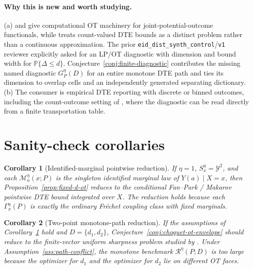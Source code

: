 \documentclass[11pt]{article}
\renewcommand{\Pr}{\mathbb{P}}
\theoremstyle{definition}
\theoremstyle{plain}
\newtheorem{corollary}{Corollary}
\theoremstyle{remark}
\begin{document}
\paragraph{Why this is new and worth studying.}
(a) \citet[Supplementary Appendix 3]{Russell2021} and
\citet[Sections 2--3]{OberReynolds2023} give computational OT machinery for
joint-potential-outcome functionals, while \citet[abstract and Section 1]{Mullahy2023}
treats count-valued DTE bounds as a distinct problem rather than a continuous
approximation.  The prior
\texttt{eid\_dist\_synth\_control}/\texttt{v1} reviewer explicitly asked for an
LP/OT diagnostic with dimension and bound width for \(\Pr\{\Delta\le d\}\).
Conjecture~\ref{conj:finite-diagnostic} contributes the missing named diagnostic
\(G^\eta_P(D)\) for an entire monotone DTE path and ties its dimension to overlap cells
and an independently generated separating dictionary.  (b) The consumer is empirical
DTE reporting with discrete or binned outcomes, including the count-outcome setting of
\citet{Mullahy2023}, where the diagnostic can be read directly from a finite
transportation table.

\section{Sanity-check corollaries}
\begin{corollary}[Identified-marginal pointwise reduction]\label{cor:fan-park-reduction}
If \(\eta=1\), \(S_x^\eta=\mathcal Y^2\), and each
\(\mathcal M_a^\eta(x;P)\) is the singleton identified marginal law of \(Y(a)\mid X=x\),
then Proposition~\ref{prop:fixed-d-ot} reduces to the conditional Fan--Park / Makarov
pointwise DTE bound integrated over \(X\).  The reduction holds because each
\(\Gamma^\eta_x(P)\) is exactly the ordinary Fr\'echet coupling class with fixed
marginals.
\end{corollary}

\begin{corollary}[Two-point monotone-path reduction]\label{cor:firpo-ridder-reduction}
If the assumptions of Corollary~\ref{cor:fan-park-reduction} hold and \(D=\{d_1,d_2\}\),
Conjecture~\ref{conj:choquet-ot-envelope} should reduce to the finite-vector uniform
sharpness problem studied by \citet{FirpoRidder2019}.  Under
Assumption~\ref{ass:path-conflict}, the monotone benchmark
\(\mathcal R^\eta(P;D)\) is too large because the optimizer for \(d_1\) and the
optimizer for \(d_2\) lie on different OT faces.
\end{corollary}
\end{document}
